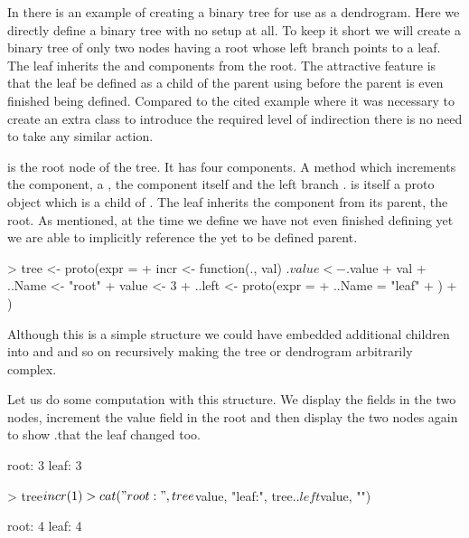 \documentclass{Z}
\begin{document}
In \cite{Gentleman2002} there is an 
example of creating a binary tree
for use as a dendrogram.  Here we directly define a binary tree with no
setup at all.  To keep it short we will create a binary tree of only
two nodes having a root whose left branch points to a leaf.  The leaf
inherits the  and  components from the root.
The attractive feature is that the leaf be defined as a child of the
parent using  before the parent is even finished
being defined.  Compared to the cited  example where it
was necessary to create an extra class to introduce the required level of
indirection there is no need to take any similar action.

 is the root node of the tree.  It has four components.  A
method  which increments the  component, a
, the  component itself and the left branch
.   is itself a proto object which is a
child of .  The leaf inherits the  component
from its parent, the root.  As mentioned, at the time we define
 we have not even finished defining  yet we
are able to implicitly reference the yet to be defined parent.

\begin{Schunk}
\begin{Sinput}
> tree <- proto(expr = {
+     incr <- function(., val) .$value <- .$value + val
+     ..Name <- "root"
+     value <- 3
+     ..left <- proto(expr = {
+         ..Name = "leaf"
+     })
+ })
\end{Sinput}
\end{Schunk}

Although this is a simple structure we could have embedded additional
children into  and  and so on recursively making
the tree or dendrogram arbitrarily complex.

Let us do some computation with this structure.  We display the
 fields in the two nodes, increment the value field in the
root and then display the two nodes again to show .that the leaf
changed too.

\begin{Schunk}
\begin{Soutput}
root: 3 leaf: 3 
\end{Soutput}
\begin{Sinput}
> tree$incr(1)
> cat("root:", tree$value, "leaf:", tree$..left$value, "\n")
\end{Sinput}
\begin{Soutput}
root: 4 leaf: 4 
\end{Soutput}
\end{Schunk}
\end{document}

